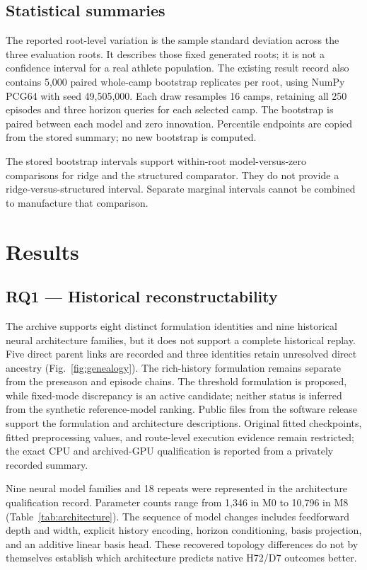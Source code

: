 \documentclass[12pt,a4paper]{article}
\begin{document}
\subsection{Statistical summaries}

The reported root-level variation is the sample standard deviation across the three evaluation roots. It describes those fixed generated roots; it is not a confidence interval for a real athlete population. The existing result record also contains 5,000 paired whole-camp bootstrap replicates per root, using NumPy PCG64 with seed 49,505,000. Each draw resamples 16 camps, retaining all 250 episodes and three horizon queries for each selected camp. The bootstrap is paired between each model and zero innovation. Percentile endpoints are copied from the stored summary; no new bootstrap is computed.

The stored bootstrap intervals support within-root model-versus-zero comparisons for ridge and the structured comparator. They do not provide a ridge-versus-structured interval. Separate marginal intervals cannot be combined to manufacture that comparison.

\section{Results}

\subsection{RQ1 — Historical reconstructability}

The archive supports eight distinct formulation identities and nine historical neural architecture families, but it does not support a complete historical replay. Five direct parent links are recorded and three identities retain unresolved direct ancestry (Fig.~\ref{fig:genealogy}). The rich-history formulation remains separate from the preseason and episode chains. The threshold formulation is proposed, while fixed-mode discrepancy is an active candidate; neither status is inferred from the synthetic reference-model ranking. Public files from the software release support the formulation and architecture descriptions. Original fitted checkpoints, fitted preprocessing values, and route-level execution evidence remain restricted; the exact CPU and archived-GPU qualification is reported from a privately recorded summary.

Nine neural model families and 18 repeats were represented in the architecture qualification record. Parameter counts range from 1,346 in M0 to 10,796 in M8 (Table~\ref{tab:architecture}). The sequence of model changes includes feedforward depth and width, explicit history encoding, horizon conditioning, basis projection, and an additive linear basis head. These recovered topology differences do not by themselves establish which architecture predicts native H72/D7 outcomes better.
\end{document}

